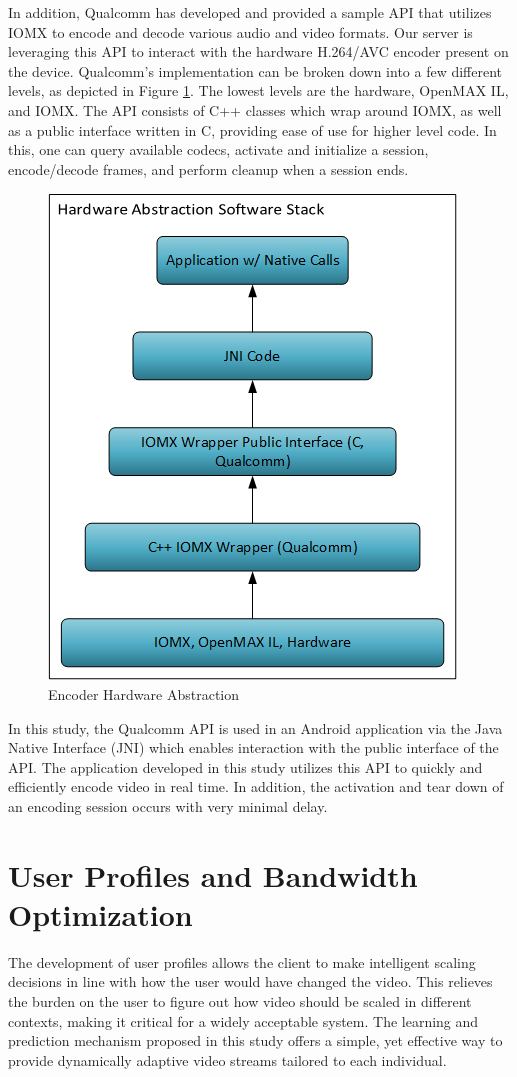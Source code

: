 \documentclass[preprint, 12pt]{elsarticle}
\begin{document}
In addition, Qualcomm has developed and provided a sample API that utilizes IOMX to encode and decode various audio and video formats. Our server is leveraging this API to interact with the hardware H.264/AVC encoder present on the device. Qualcomm's implementation can be broken down into a few different levels, as depicted in Figure \ref{fig:QualcommAPI}. The lowest levels are the hardware, OpenMAX IL, and IOMX. The API consists of C++ classes which wrap around IOMX, as well as a public interface written in C, providing ease of use for higher level code. In this, one can query available codecs, activate and initialize a session, encode/decode frames, and perform cleanup when a session ends.
\begin{figure}[h]
\centering
\includegraphics[width=0.4\linewidth]{QualcommAPI.png}
\caption{Encoder Hardware Abstraction}
\label{fig:QualcommAPI}
\end{figure}
In this study, the Qualcomm API is used in an Android application via the Java Native Interface (JNI) which enables interaction with the public interface of the API. The application developed in this study utilizes this API to quickly and efficiently encode video in real time. In addition, the activation and tear down of an encoding session occurs with very minimal delay.


\section{User Profiles and Bandwidth Optimization}
\label{sec:UserProfiles}

The development of user profiles allows the client to make intelligent scaling decisions in line with how the user would have changed the video. This relieves the burden on the user to figure out how video should be scaled in different contexts, making it critical for a widely acceptable system. The learning and prediction mechanism proposed in this study offers a simple, yet effective way to provide dynamically adaptive video streams tailored to each individual.
\end{document}
